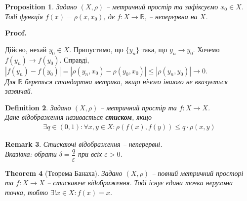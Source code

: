 \documentclass[a4paper, 10pt]{article}
\makeatletter
\theoremstyle{theoremdd}
\newtheorem{theorem}{Theorem}[subsection]
\theoremstyle{theoremdd}
\newtheorem{definition}[theorem]{Definition}
\theoremstyle{theoremdd}
\theoremstyle{theoremdd}
\theoremstyle{theoremdd}
\newtheorem{proposition}[theorem]{Proposition}
\theoremstyle{theoremdd}
\newtheorem{remark}[theorem]{Remark}
\theoremstyle{theoremdd}
\theoremstyle{theoremdd}
\renewenvironment{proof}[1][Proof.\\]{\par
\pushQED{\hfill \qed}%
\normalfont \topsep6\p@\@plus6\p@\relax
\trivlist
\item\relax
{\bfseries
#1\@addpunct{.}}\hspace\labelsep\ignorespaces
}{%
\popQED\endtrivlist\@endpefalse
}
\makeatother
\begin{document}
\begin{proposition}
\label{continuity_of_metric_function_of_one_argument}
Задано $(X,\rho)$ -- метричний простір та зафіксуємо $x_0 \in X$. Тоді функція $f(x) = \rho(x,x_0)$, де $f \colon X \to \mathbb{R}$, -- неперервна на $X$.
\end{proposition}

\begin{proof}
Дійсно, нехай $y_0 \in X$. Припустимо, що $\{y_n\}$ така, що  $y_n \to y_0$. Хочемо $f(y_n) \to f(y_0)$. Справді,\\
$|f(y_n) - f(y_0)| = |\rho(y_n,x_0) - \rho(y_0,x_0)| \leq |\rho(y_n,y_0)| \to 0$.\\
\textit{Для $\mathbb{R}$ береться стандартна метрика, якщо нічого іншого не вказується зазвичай.}
\end{proof}

\begin{definition}
Задано $(X,\rho)$ -- метричний простір та $f \colon X \to X$.\\
Дане відображення називається \textbf{стиском}, якщо
\begin{align*}
\exists q \in (0,1): \forall x,y \in X: \rho(f(x),f(y)) \leq q \cdot \rho(x,y)
\end{align*}
\end{definition}

\begin{remark}
Стискаючі відображення -- неперервні.\\
\textit{Вказівка: обрати $\delta = \dfrac{q}{\varepsilon}$ при всіх $\varepsilon > 0$.}
\end{remark}

\begin{theorem}[Теорема Банаха]
Задано $(X,\rho)$ -- повний метричний просторі та $f \colon X \to X$ -- стискаюче відображення. Тоді існує єдина точка нерухома точка, тобто $\exists ! x \in X: f(x) = x$.
\end{theorem}
\end{document}
